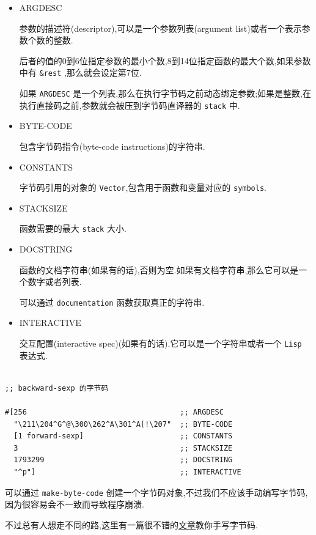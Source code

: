 \documentclass[11pt]{article}
\begin{document}
\begin{itemize}
\item ARGDESC

参数的描述符(descriptor),可以是一个参数列表(argument list)或者一个表示参数个数的整数.

后者的值的0到6位指定参数的最小个数,8到14位指定函数的最大个数,如果参数中有 \texttt{\&rest} ,那么就会设定第7位.

如果 \texttt{ARGDESC} 是一个列表,那么在执行字节码之前动态绑定参数;如果是整数,在执行直接码之前,参数就会被压到字节码直译器的 \texttt{stack} 中.

\item BYTE-CODE

包含字节码指令(byte-code instructions)的字符串.

\item CONSTANTS

字节码引用的对象的 \texttt{Vector},包含用于函数和变量对应的 \texttt{symbols}.

\item STACKSIZE

函数需要的最大 \texttt{stack} 大小.

\item DOCSTRING

函数的文档字符串(如果有的话),否则为空.如果有文档字符串,那么它可以是一个数字或者列表.

可以通过 \texttt{documentation} 函数获取真正的字符串.

\item INTERACTIVE

交互配置(interactive spec)(如果有的话).它可以是一个字符串或者一个 \texttt{Lisp} 表达式.
\end{itemize}

\begin{verbatim}

;; backward-sexp 的字节码

#[256                                   ;; ARGDESC
  "\211\204^G^@\300\262^A\301^A[!\207"  ;; BYTE-CODE
  [1 forward-sexp]                      ;; CONSTANTS
  3                                     ;; STACKSIZE
  1793299                               ;; DOCSTRING
  "^p"]                                 ;; INTERACTIVE
\end{verbatim}

可以通过 \texttt{make-byte-code} 创建一个字节码对象,不过我们不应该手动编写字节码,因为很容易会不一致而导致程序崩溃.

不过总有人想走不同的路,这里有一篇很不错的\href{https://nullprogram.com/blog/2014/01/04/}{文章}教你手写字节码.
\end{document}
